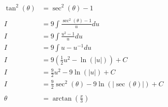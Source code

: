 \documentclass[12pt]{article}
\begin{document}
\begin{align}
    \nonumber                                                                                                                                                                                               \\
    \tan^2(\theta)                                   & = \sec^2(\theta) - 1                                                                                                                                 \\
    \nonumber                                                                                                                                                                                               \\
    I                                                & = 9\int \frac{\sec^2(\theta) - 1}{u} du                                                                                                              \\
    I                                                & = 9\int \frac{u^2 - 1}{u} du                                                                                                                         \\
    I                                                & = 9\int u - u^{-1} du                                                                                                                                \\
    I                                                & = 9 \left( \frac{1}{2}u^2 - \ln(|u|) \right) + C                                                                                                     \\
    I                                                & = \frac{9}{2}u^2 - 9\ln(|u|) + C                                                                                                                     \\
    I                                                & = \frac{9}{2}\sec^2(\theta) - 9\ln(|\sec(\theta)|) + C                                                                                               \\
    \nonumber                                                                                                                                                                                               \\
    \theta                                           & = \arctan\left(\frac{x}{3}\right)                                                                                                                    \\

\end{align}
\end{document}
